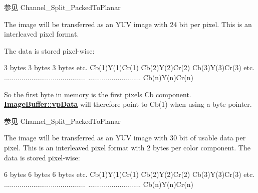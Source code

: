 \begin{Desc}
\begin{description}
\begin{DoxySeeAlso}{参见}
Channel\+\_\+\+Split\+\_\+\+Packed\+To\+Planar 
\end{DoxySeeAlso}
\item[{\em 
\hypertarget{group___common_interface_gga456e8aa76e06bb761f27c52141475985a632fa84e36dd3f055697a47a6a87e0bb}{ibpf\+Y\+U\+V444\+\_\+\+U\+Y\+V\+Packed}\label{group___common_interface_gga456e8aa76e06bb761f27c52141475985a632fa84e36dd3f055697a47a6a87e0bb}
}]The image will be transferred as an Y\+U\+V image with 24 bit per pixel. This is an interleaved pixel format.

The data is stored pixel-\/wise\+:


\begin{DoxyCode}
3 bytes        3 bytes        3 bytes      etc.
Cb(1)Y(1)Cr(1) Cb(2)Y(2)Cr(2) Cb(3)Y(3)Cr(3) etc.
..........................................
...........................   Cb(n)Y(n)Cr(n)
\end{DoxyCode}


So the first byte in memory is the first pixels Cb component. {\bfseries \hyperlink{struct_image_buffer_ab67c9c21d749e786302c848b508e0673}{Image\+Buffer\+::vp\+Data}} will therefore point to Cb(1) when using a byte pointer.

\begin{DoxySeeAlso}{参见}
Channel\+\_\+\+Split\+\_\+\+Packed\+To\+Planar 
\end{DoxySeeAlso}
\item[{\em 
\hypertarget{group___common_interface_gga456e8aa76e06bb761f27c52141475985a26b1398899afa6045cb6f1a5f6400ed2}{ibpf\+Y\+U\+V444\+\_\+\+U\+Y\+V\+\_\+10\+Packed}\label{group___common_interface_gga456e8aa76e06bb761f27c52141475985a26b1398899afa6045cb6f1a5f6400ed2}
}]The image will be transferred as an Y\+U\+V image with 30 bit of usable data per pixel. This is an interleaved pixel format with 2 bytes per color component. The data is stored pixel-\/wise\+:


\begin{DoxyCode}
6 bytes        6 bytes        6 bytes      etc.
Cb(1)Y(1)Cr(1) Cb(2)Y(2)Cr(2) Cb(3)Y(3)Cr(3) etc.
..........................................
...........................   Cb(n)Y(n)Cr(n)
\end{DoxyCode}



\end{description}
\end{Desc}
